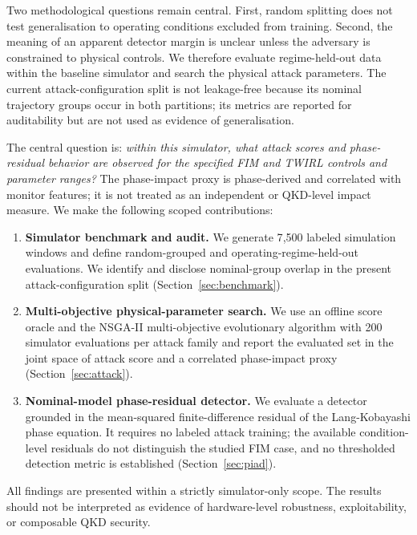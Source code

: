 \documentclass[journal,twocolumn]{IEEEtran}
\begin{document}
Two methodological questions remain central. First, random splitting does not test
generalisation to operating conditions excluded from training. Second, the meaning
of an apparent detector margin is unclear unless the adversary is constrained to
physical controls. We therefore evaluate regime-held-out data within the baseline
simulator and search the physical attack parameters. The current attack-configuration
split is not leakage-free because its nominal trajectory groups occur in both
partitions; its metrics are reported for auditability but are not used as evidence of
generalisation.

The central question is: \emph{within this simulator, what attack scores and
phase-residual behavior are observed for the specified FIM and TWIRL controls and
parameter ranges?} The phase-impact proxy is phase-derived and correlated with monitor
features; it is not treated as an independent or QKD-level impact measure. We make the
following scoped contributions:

\begin{enumerate}
  \item \textbf{Simulator benchmark and audit.} We generate 7{,}500 labeled
    simulation windows and define random-grouped and operating-regime-held-out
    evaluations. We identify and disclose nominal-group overlap in the present
    attack-configuration split (Section~\ref{sec:benchmark}).

  \item \textbf{Multi-objective physical-parameter search.} We use an offline
    score oracle and the NSGA-II multi-objective evolutionary algorithm with
    200 simulator evaluations per attack family and report the evaluated set in the
    joint space of attack score and a correlated phase-impact proxy
    (Section~\ref{sec:attack}).

  \item \textbf{Nominal-model phase-residual detector.} We evaluate a detector
    grounded in the mean-squared finite-difference residual of the Lang-Kobayashi
    phase equation. It requires no labeled attack training; the available
    condition-level residuals do not distinguish the studied FIM case, and no
    thresholded detection metric is established
    (Section~\ref{sec:piad}).
\end{enumerate}

All findings are presented within a strictly simulator-only scope. The results should
not be interpreted as evidence of hardware-level robustness, exploitability, or
composable QKD security.
\end{document}
